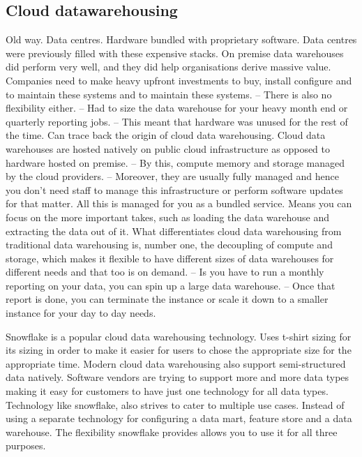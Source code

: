 \documentclass[11pt]{article}
\begin{document}
    \subsection{Cloud datawarehousing}

    Old way. Data centres. Hardware bundled with proprietary software.
    Data centres were previously filled with these expensive stacks.
    On premise data warehouses did perform very well, and they did help organisations derive massive value.
    Companies need to make heavy upfront investments to buy, install configure and to maintain these systems and to maintain these systems.
    -- There is also no flexibility either.
    -- Had to size the data warehouse for your heavy month end or quarterly reporting jobs.
    -- This meant that hardware was unused for the rest of the time.
    Can trace back the origin of cloud data warehousing.
    Cloud data warehouses are hosted natively on public cloud infrastructure as opposed to hardware hosted on premise.
    -- By this, compute memory and storage managed by the cloud providers.
    -- Moreover, they are usually fully managed and hence you don't need staff to manage this infrastructure or perform software updates for that matter.
    All this is managed for you as a bundled service.
    Means you can focus on the more important takes, such as loading the data warehouse and extracting the data out of it.
    What differentiates cloud data warehousing from traditional data warehousing is, number one, the decoupling of compute and storage, which makes it flexible to have different sizes of data warehouses for different needs and that too is on demand.
    -- Is you have to run a monthly reporting on your data, you can spin up a large data warehouse.
    -- Once that report is done, you can terminate the instance or scale it down to a smaller instance for your day to day needs.

    Snowflake is a popular cloud data warehousing technology. Uses t-shirt sizing for its sizing in order to make it easier for users to chose the appropriate size for the appropriate time.
    Modern cloud data warehousing also support semi-structured data natively.
    Software vendors are trying to support more and more data types making it easy for customers to have just one technology for all data types.
    Technology like snowflake, also strives to cater to multiple use cases.
    Instead of using a separate technology for configuring a data mart, feature store and a data warehouse. The flexibility snowflake provides allows you to use it for all three purposes.
\end{document}
